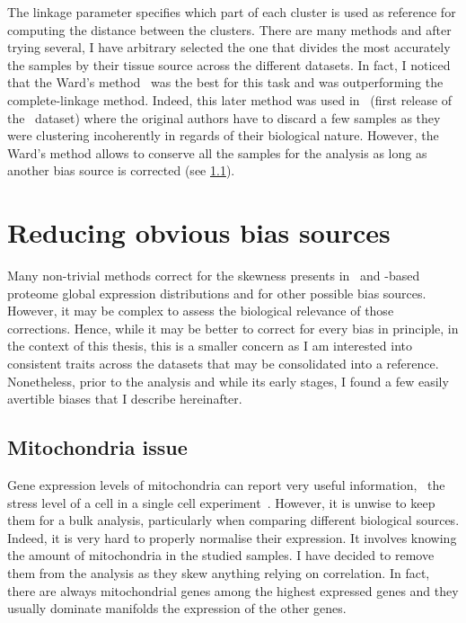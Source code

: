 The linkage parameter specifies which part of each cluster is used as reference
for computing the distance between the clusters. There are many methods and after
trying several, I have arbitrary selected the one that divides the most accurately
the samples by their tissue source across the different datasets.
In fact, I noticed that the Ward's method~
was the best for this task and was outperforming the complete-linkage method.
Indeed, this later method was used in~
(first release of the \uhlen\ dataset) where
the original authors have to discard a few samples as they were clustering
incoherently in regards of their biological nature.
However, the Ward's method allows to conserve all the samples for the analysis
as long as another bias source is corrected (see \cref{subsec:mito}).


\section{Reducing obvious bias sources}

Many non-trivial methods correct for the skewness presents in
\Rnaseq\ and \ms-based proteome global expression distributions
and for other possible bias sources.
However, it may be complex to assess the biological relevance of those corrections.
Hence, while it may be better to correct for every bias in principle,
in the context of this thesis, this is a smaller concern as I am interested into
consistent traits across the datasets that may be consolidated into a reference.
Nonetheless, prior to the analysis and while its early stages,
I found a few easily avertible biases that I describe hereinafter.


\subsection{Mitochondria issue}\label{subsec:mito}

Gene expression levels of mitochondria can report very useful information,
\eg\ the stress level of a cell in a single cell experiment~.
However, it is unwise to keep them for a bulk analysis, particularly when
comparing different biological sources.
Indeed, it is very hard to properly normalise their expression.
It involves knowing the amount of mitochondria in the studied samples.
I have decided to remove them from the analysis as they skew anything relying
on correlation.
In fact, there are always mitochondrial genes among the highest expressed genes
and they usually dominate manifolds the expression of the other genes.

